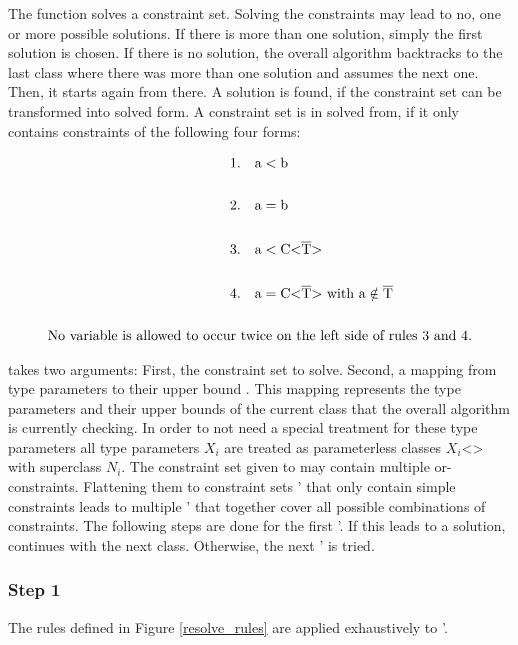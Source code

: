 The function  solves a constraint set. Solving the constraints may lead to no, one or more possible solutions. If there is more than one solution, simply the first solution is chosen. If there is no solution, the overall algorithm backtracks to the last class where there was more than one solution and assumes the next one. Then, it starts again from there.
A solution is found, if the constraint set can be transformed into solved form. A constraint set is in solved from, if it only contains constraints of the following four forms:

\begin{align*}
    1.& \quad \text{a} < \text{b}\\
    \\
    2.& \quad \text{a} = \text{b}\\
    \\
    3.& \quad \text{a} < \text{C<} \ot{T} \text{>}\\
    \\
    4.& \quad \text{a} = \text{C<} \ot{T} \text{>} \ \text{with a} \notin \ot{T}\\
    \\
    \text{No variable is allowed to occur } & \text{twice on the left side of rules 3 and 4.}
\end{align*}

 takes two arguments: First, the constraint set to solve. Second, a mapping from type parameters  to their upper bound . This mapping represents the type parameters and their upper bounds of the current class that the overall algorithm is currently checking.
In order to not need a special treatment for these type parameters all type parameters $X_i$ are treated as parameterless classes $X_i$<> with superclass $N_i$.
The constraint set  given to  may contain multiple or-constraints. Flattening them to constraint sets ' that only contain simple constraints leads to multiple ' that together cover all possible combinations of constraints.
The following steps are done for the first '. If this leads to a solution,  continues with the next class. Otherwise, the next ' is tried.

\subsubsection{Step 1}
The rules defined in Figure \ref{resolve_rules} are applied exhaustively to '.

